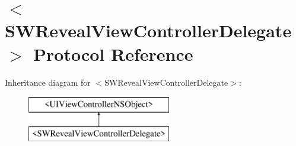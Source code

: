 \hypertarget{protocol_s_w_reveal_view_controller_delegate-p}{}\section{$<$S\+W\+Reveal\+View\+Controller\+Delegate$>$ Protocol Reference}
\label{protocol_s_w_reveal_view_controller_delegate-p}
Inheritance diagram for $<$S\+W\+Reveal\+View\+Controller\+Delegate$>$\+:\begin{figure}[H]
\begin{center}
\leavevmode
\includegraphics[height=2.000000cm]{protocol_s_w_reveal_view_controller_delegate-p}
\end{center}
\end{figure}
